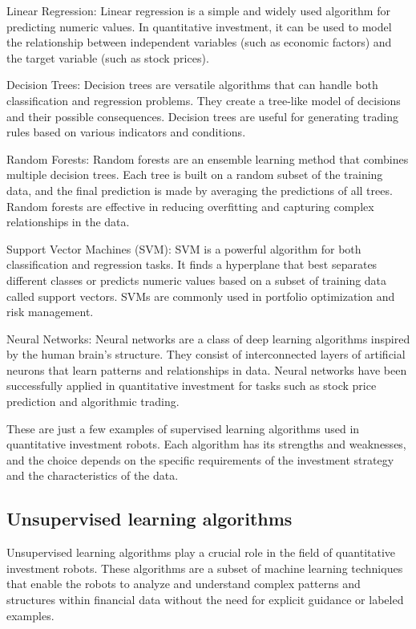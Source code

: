 \documentclass[UTF8]{ctexart}
\begin{document}
Linear Regression: Linear regression is a simple and widely used algorithm for predicting numeric values. In quantitative investment, it can be used to model the relationship between independent variables (such as economic factors) and the target variable (such as stock prices).

Decision Trees: Decision trees are versatile algorithms that can handle both classification and regression problems. They create a tree-like model of decisions and their possible consequences. Decision trees are useful for generating trading rules based on various indicators and conditions.

Random Forests: Random forests are an ensemble learning method that combines multiple decision trees. Each tree is built on a random subset of the training data, and the final prediction is made by averaging the predictions of all trees. Random forests are effective in reducing overfitting and capturing complex relationships in the data.

Support Vector Machines (SVM): SVM is a powerful algorithm for both classification and regression tasks. It finds a hyperplane that best separates different classes or predicts numeric values based on a subset of training data called support vectors. SVMs are commonly used in portfolio optimization and risk management.

Neural Networks: Neural networks are a class of deep learning algorithms inspired by the human brain's structure. They consist of interconnected layers of artificial neurons that learn patterns and relationships in data. Neural networks have been successfully applied in quantitative investment for tasks such as stock price prediction and algorithmic trading.

These are just a few examples of supervised learning algorithms used in quantitative investment robots. Each algorithm has its strengths and weaknesses, and the choice depends on the specific requirements of the investment strategy and the characteristics of the data.
\subsection{Unsupervised learning algorithms}
Unsupervised learning algorithms play a crucial role in the field of quantitative investment robots. These algorithms are a subset of machine learning techniques that enable the robots to analyze and understand complex patterns and structures within financial data without the need for explicit guidance or labeled examples.
\end{document}
